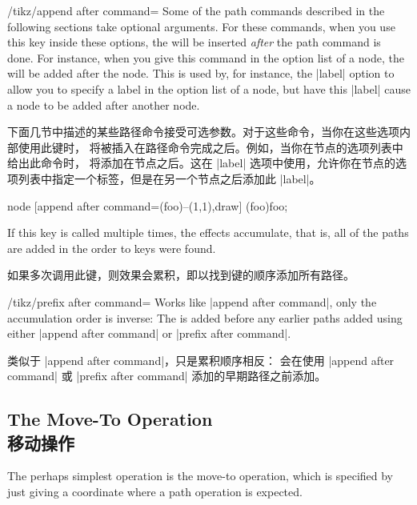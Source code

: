\begin{key}{/tikz/append after command=}
    Some of the path commands described in the following sections take optional
    arguments. For these commands, when you use this key inside these options,
    the  will be inserted \emph{after} the path command is done. For
    instance, when you give this command in the option list of a node, the
     will be added after the node. This is used by, for instance,
    the |label| option to allow you to specify a label in the option list of a
    node, but have this |label| cause a node to be added after another node.

    下面几节中描述的某些路径命令接受可选参数。对于这些命令，当你在这些选项内部使用此键时， 将被插入在路径命令完成之后。例如，当你在节点的选项列表中给出此命令时， 将添加在节点之后。这在 |label| 选项中使用，允许你在节点的选项列表中指定一个标签，但是在另一个节点之后添加此 |label|。

\begin{codeexample}[]
\tikz \draw node [append after command={(foo)--(1,1)},draw] (foo){foo};
\end{codeexample}
    If this key is called multiple times, the effects accumulate, that is, all
    of the paths are added in the order to keys were found.

    如果多次调用此键，则效果会累积，即以找到键的顺序添加所有路径。

\end{key}

\begin{key}{/tikz/prefix after command=}
    Works like |append after command|, only the accumulation order is inverse:
    The  is added before any earlier paths added using either
    |append after command| or |prefix after command|.

    类似于 |append after command|，只是累积顺序相反： 会在使用 |append after command| 或 |prefix after command| 添加的早期路径之前添加。

\end{key}


\subsection{The Move-To Operation\\移动操作}

The perhaps simplest operation is the move-to operation, which is specified by
just giving a coordinate where a path operation is expected.

